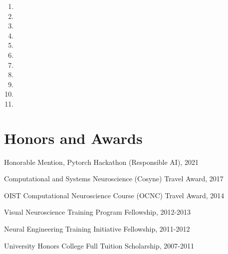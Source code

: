 \documentclass[10pt,letterpaper]{article}
\renewenvironment{itemize}{
  \begin{list}{}{
    \setlength{\leftmargin}{1.5em}
    \setlength{\itemsep}{0.25em}
    \setlength{\parskip}{0pt}
    \setlength{\parsep}{0.25em}
  }
}{
  \end{list}
}
\begin{document}
\begin{enumerate}[resume]
\item {}
\item {}
\item {}
\item {}
\item {}
\item {}
\item {}
\item {}
\item {}
\item {}
\item {}
\end{enumerate}


\vspace{-0.25in}

\section*{Honors and Awards}
\vspace{-0.05in}
\begin{itemize}
  \setlength\itemsep{1pt}
  \item Honorable Mention, Pytorch Hackathon (Responsible AI), 2021
  \item Computational and Systems Neuroscience (Cosyne) Travel Award, 2017
  \item OIST Computational Neuroscience Course (OCNC) Travel Award, 2014
  \item Visual Neuroscience Training Program Fellowship, 2012-2013
  \item Neural Engineering Training Initiative Fellowship, 2011-2012
  \item University Honors College Full Tuition Scholarship, 2007-2011
\end{itemize}

\vspace{-0.25in}
\end{document}
